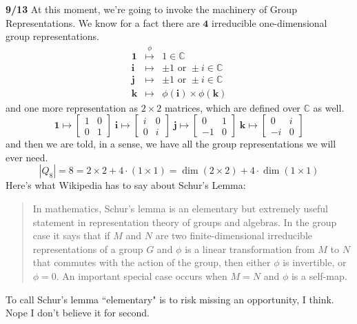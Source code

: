 \documentclass[12pt]{article}
\newcommand{\one}{\mathbf{1}}
\newcommand{\ii}{\mathbf{i}}
\newcommand{\jj}{\mathbf{j}}
\newcommand{\kk}{\mathbf{k}}
\begin{document}
\newpage

\noindent \textbf{9/13} At this moment, we're going to invoke the machinery of Group Representations.  We know for a fact there are $\mathbf{4}$ irreducible one-dimensional group representations.  
\begin{eqnarray*}
\one & \stackrel{\phi}{\mapsto} & 1 \in \mathbb{C} \\
\ii  & \mapsto & \pm 1 \text{ or } \pm i \in \mathbb{C}\\
\jj  & \mapsto & \pm 1 \text{ or } \pm i \in \mathbb{C}\\
\kk  & \mapsto & \phi(\ii) \times \phi(\kk)
\end{eqnarray*}
and one more representation as $2 \times 2$ matrices, which are defined over $\mathbb{C}$ as well.
$$ 
\one \mapsto \left[ \begin{array}{cc} 1 & 0 \\ 0 & 1 \end{array} \right] \;
\ii \mapsto \left[ \begin{array}{cc} i & 0 \\ 0 & i \end{array} \right]  \;
\jj \mapsto \left[ \begin{array}{rr} 0 & 1 \\ -1 & 0 \end{array} \right]  \;
\kk \mapsto \left[ \begin{array}{rr} 0 & i \\ -i & 0 \end{array} \right] $$ 
and then we are told, in a sense, we have all the group representations we will ever need. 
$$ |Q_8| = 8 = 2 \times 2 + 4 \cdot (1 \times 1) = \dim (2 \times 2) + 4 \cdot \dim (1 \times 1) $$
Here's what Wikipedia has to say about Schur's Lemma:
\begin{quotation}
\noindent In mathematics, Schur's lemma is an elementary but extremely useful statement in representation theory of groups and algebras. In the group case it says that if $M$ and $N$ are two finite-dimensional irreducible representations of a group $G$ and $\phi$ is a linear transformation from $M$ to $N$ that commutes with the action of the group, then either $\phi$ is invertible, or $\phi = 0$. An important special case occurs when $M = N$ and $\phi$ is a self-map.
\end{quotation}
To call Schur's lemma ``elementary" is to risk missing an opportunity, I think.  Nope I don't believe it for second. \\ \\
\end{document}
